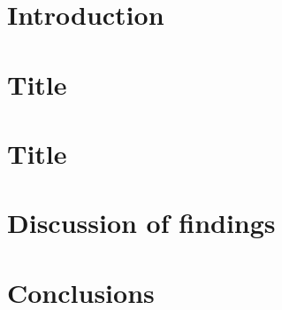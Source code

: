 \documentclass[12pt, a4paper]{report} %
\begin{document}
\chapter{Introduction}


\chapter{Title}%


\chapter{Title}%


\chapter{Discussion of findings}


\chapter{Conclusions}


\pagestyle{plain}
\newpage
{}


\newpage
\appendix

\end{document}
